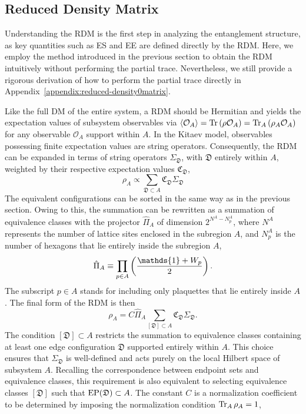 \subsection{Reduced Density Matrix}\label{sec:density-matrix-reduced}

Understanding the RDM is the first step in analyzing the entanglement structure, as key quantities such as ES and EE are defined directly by the RDM. Here, we employ the method introduced in the previous section to obtain the RDM intuitively without performing the partial trace. Nevertheless, we still provide a rigorous derivation of how to perform the partial trace directly in Appendix~\ref{appendix:reduced-density0matrix}. 

Like the full DM of the entire system, a RDM should be Hermitian and yields the expectation values of subsystem observables via $\left\langle \mathcal{O}_A \right\rangle=\Tr\left( \rho\mathcal{O}_A \right)=\Tr_A\left( \rho_A\mathcal{O}_A \right)$ for any observable $\mathcal{O}_A$ support within $A$. In the Kitaev model, observables possessing finite expectation values are string operators. Consequently, the RDM can be expanded in terms of string operators $\Sigma_\mathfrak{D}$, with $\mathfrak{D}$ entirely within $A$, weighted by their respective expectation values $\mathfrak{C}_\mathfrak{D}$,
\begin{equation}\label{equ.rho-A-raw-guess}
    \rho_A \propto\sum_{\mathfrak{D}\subset A}\mathfrak{C}_\mathfrak{D} \Sigma_\mathfrak{D}
\end{equation}
The equivalent configurations can be sorted in the same way as in the previous section. Owing to this, the summation can be rewritten as a summation of {equivalence classes} with the projector $\hat{\Pi}_A$ of dimension $2^{N^A-N^A_p}$, {where $N^A$ represents the number of lattice sites enclosed in the subregion $A$, and $N^A_p$ is the number of hexagons that lie entirely inside the subregion $A$},
\begin{equation}\label{equ.p-proj-A}
    \hat{\Pi}_A \equiv \prod_{p\in A}\lr{\frac{\mathds{1}+W_p}{2}}.
\end{equation}
{The subscript $p\in A$ stands for including only plaquettes that lie entirely inside $A$.} The final form of the RDM is then
\[
\rho_A = C\hat{\Pi}_A\sum_{[\mathfrak{D}]\subset A}\mathfrak{C}_{\mathfrak{D}}\Sigma_{\mathfrak{D}}.
\]
The condition $[\mathfrak{D}] \subset A$ restricts the summation to equivalence classes containing at least one edge configuration $\mathfrak{D}$ supported entirely within $A$. This choice ensures that $\Sigma_{\mathfrak{D}}$ is well-defined and acts purely on the local Hilbert space of subsystem $A$. Recalling the correspondence between endpoint sets and {equivalence classes}, this requirement is also equivalent to selecting equivalence classes $[\mathfrak{D}]$ such that $\mathrm{EP}(\mathfrak{D})\subset A$. The constant $C$ is a normalization coefficient to be determined by imposing the normalization condition $\Tr_A\rho_A=1$,
